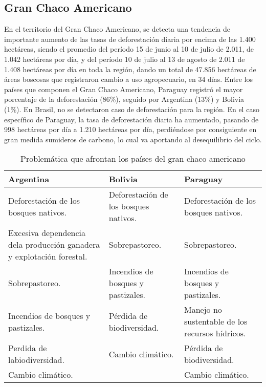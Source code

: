 \subsection{Gran Chaco Americano}
En el territorio del Gran Chaco Americano, se detecta una tendencia de importante aumento de las tasas de deforestaci\'on diaria por encima de las 1.400 hect\'areas, siendo el promedio del per\'iodo 15 de junio al 10 de julio de 2.011, de 1.042 hect\'areas por d\'ia, y del per\'iodo 10 de julio al 13 de agosto de 2.011 de 1.408 hect\'areas por d\'ia en toda la regi\'on, dando un total de 47.856 hect\'areas de \'areas boscosas que registraron cambio a uso agropecuario, en 34 d\'ias. Entre los pa\'ises que componen el Gran Chaco Americano,  Paraguay  registr\'o el mayor porcentaje de la deforestaci\'on (86\%), seguido por Argentina (13\%) y Bolivia (1\%). En Brasil, no se detectaron caso de deforestaci\'on para la regi\'on. En el caso espec\'ifico de Paraguay, la tasa de deforestaci\'on diaria ha aumentado, pasando de 998 hect\'areas por d\'ia a 1.210 hect\'areas por d\'ia\cite{fao2003revista}, perdi\'endose por consiguiente en gran medida sumideros de carbono, lo cual va aportando al desequilibrio del ciclo.
\begin{table}[!hbtp]
	\centering
	\caption{Problemática que afrontan los países del gran chaco americano}
	\label{tab:chacoamericano}
	\begin{tabular}{|p{4cm}|p{4cm}|p{4cm}|}
		\hline
		{\bf Argentina} & {\bf Bolivia} & {\bf Paraguay} \\ \hline
		Deforestaci\'on de los bosques nativos. & Deforestaci\'on de los bosques nativos. & Deforestaci\'on de los bosques nativos. \\ \hline
		Excesiva dependencia dela producci\'on ganadera y explotaci\'on forestal. & Sobrepastoreo. & Sobrepastoreo. \\ \hline
		Sobrepastoreo. & Incendios de bosques y pastizales. & Incendios de bosques y pastizales. \\ \hline
		Incendios de bosques y pastizales. & P\'erdida de biodiversidad. & Manejo no sustentable de los recursos h\'idricos. \\ \hline
		Perdida de labiodiversidad. & Cambio clim\'atico. & P\'erdida de biodiversidad. \\ \hline
		Cambio clim\'atico. &  & Cambio clim\'atico. \\ \hline
	\end{tabular}
\end{table}


